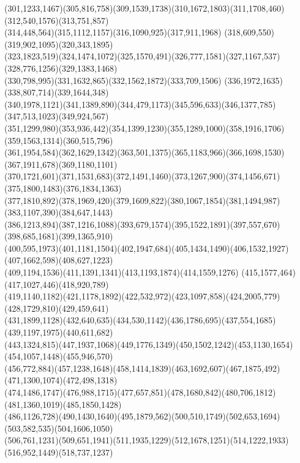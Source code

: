 \documentclass[a4paper,twopage,reqno,12pt]{amsart}
\theoremstyle{definition}
\numberwithin{equation}{section}
\begin{document}
\begin{enumerate}
{{(301,1233,1467)(305,816,758)(309,1539,1738)(310,1672,1803)(311,1708,460)(312,540,1576)(313,751,857)\\
(314,448,564)(315,1112,1157)(316,1090,925)(317,911,1968)
(318,609,550)(319,902,1095)(320,343,1895)\\
(323,1823,519)(324,1474,1072)(325,1570,491)(326,777,1581)(327,1167,537)(328,776,1256)(329,1383,1468)\\
(330,798,995)(331,1632,865)(332,1562,1872)(333,709,1506)
(336,1972,1635)(338,807,714)(339,1644,348)\\
(340,1978,1121)(341,1389,890)(344,479,1173)(345,596,633)(346,1377,785)(347,513,1023)(349,924,567)\\
(351,1299,980)(353,936,442)(354,1399,1230)(355,1289,1000)(358,1916,1706)(359,1563,1314)(360,515,796)\\
(361,1954,584)(362,1629,1342)(363,501,1375)(365,1183,966)(366,1698,1530)(367,1911,678)(369,1180,1101)\\
(370,1721,601)(371,1531,683)(372,1491,1460)(373,1267,900)(374,1456,671)(375,1800,1483)(376,1834,1363)\\
(377,1810,892)(378,1969,420)(379,1609,822)(380,1067,1854)(381,1494,987)(383,1107,390)(384,647,1443)\\
(386,1213,894)(387,1216,1088)(393,679,1574)(395,1522,1891)(397,557,670)(398,685,1681)(399,1365,910)\\
(400,595,1973)(401,1181,1504)(402,1947,684)(405,1434,1490)(406,1532,1927)(407,1662,598)(408,627,1223)\\
(409,1194,1536)(411,1391,1341)(413,1193,1874)(414,1559,1276)
(415,1577,464)(417,1027,446)(418,920,789)\\
(419,1140,1182)(421,1178,1892)(422,532,972)(423,1097,858)(424,2005,779)(428,1729,810)(429,459,641)\\
(431,1899,1128)(432,640,635)(434,530,1142)(436,1786,695)(437,554,1685)(439,1197,1975)(440,611,682)\\
(443,1324,815)(447,1937,1068)(449,1776,1349)(450,1502,1242)(453,1130,1654)(454,1057,1448)(455,946,570)\\
(456,772,884)(457,1238,1648)(458,1414,1839)(463,1692,607)(467,1875,492)(471,1300,1074)(472,498,1318)\\
(474,1486,1747)(476,988,1715)(477,657,851)(478,1680,842)(480,706,1812)(481,1360,1019)(485,1850,1428)\\
(486,1126,728)(490,1430,1640)(495,1879,562)(500,510,1749)(502,653,1694)(503,582,535)(504,1606,1050)\\
(506,761,1231)(509,651,1941)(511,1935,1229)(512,1678,1251)(514,1222,1933)(516,952,1449)(518,737,1237)\\
}}
\end{enumerate}
\end{document}

